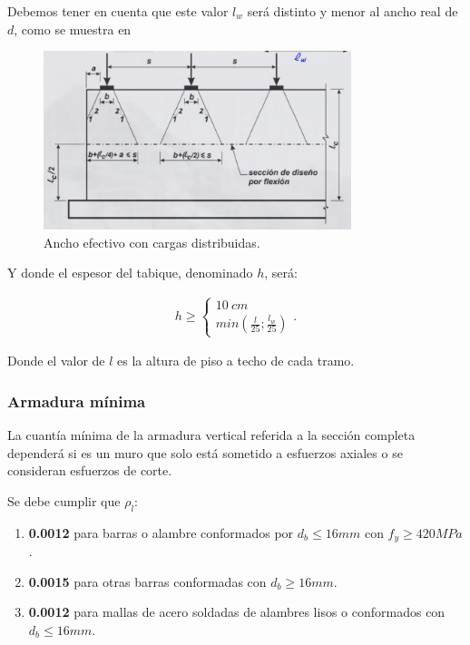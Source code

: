 \documentclass[../main.tex]{subfiles}
\begin{document}
Debemos tener en cuenta que este valor $l_w$ será distinto y menor al ancho
real de $d$, como se muestra en 

\begin{figure}[htpb]
  \centering
  \includegraphics[width=0.8\textwidth]{../images/20210608/anchoefectivo}
  \caption{Ancho efectivo con cargas distribuidas.}
  \label{fig:anchoefectivo}
\end{figure}

Y donde el espesor del tabique, denominado $h$, será:

 \begin{align*}
  h \geq \begin{cases}
  \SI{10}{cm} \\
  min\left( \frac{l}{25};\frac{l_w}{25} \right) 
  \end{cases}
.\end{align*}

Donde el valor de $l$ es la altura de piso a techo de cada tramo.

\subsubsection{Armadura mínima}

La cuantía mínima de la armadura vertical referida a la sección completa
dependerá si es un muro que solo está sometido a esfuerzos axiales o se 
consideran esfuerzos de corte.

Se debe cumplir que $\rho_l$:

\begin{enumerate}
  \item \textbf{0.0012} para barras o alambre conformados por $d_b \leq 16mm$
    con $f_y\geq 420MPa$.
  \item \textbf{0.0015} para otras barras conformadas con $d_b\geq 16mm$.
  \item \textbf{0.0012} para mallas de acero soldadas de alambres lisos o
    conformados con $d_b \leq 16mm$.
\end{enumerate}
\end{document}
